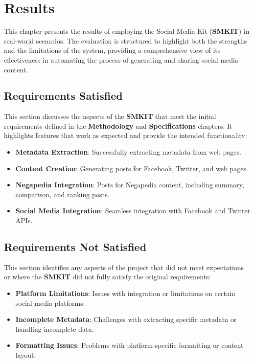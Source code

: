 
\chapter{Results}
\label{chp:results}
This chapter presents the results of employing the Social Media Kit (\textbf{SMKIT}) in real-world scenarios. The evaluation is structured to highlight both the strengths and the limitations of the system, providing a comprehensive view of its effectiveness in automating the process of generating and sharing social media content.


\section{Requirements Satisfied}
\label{sec:requirements_satisfied}
This section discusses the aspects of the \textbf{SMKIT} that meet the initial requirements defined in the \textbf{Methodology} and \textbf{Specifications} chapters. It highlights features that work as expected and provide the intended functionality:
\begin{itemize}
    \item \textbf{Metadata Extraction}: Successfully extracting metadata from web pages.
    \item \textbf{Content Creation}: Generating posts for Facebook, Twitter, and web pages.
    \item \textbf{Negapedia Integration}: Posts for Negapedia content, including summary, comparison, and ranking posts.
    \item \textbf{Social Media Integration}: Seamless integration with Facebook and Twitter APIs.
\end{itemize}


\section{Requirements Not Satisfied}
\label{sec:requirements_not_satisfied}
This section identifies any aspects of the project that did not meet expectations or where the \textbf{SMKIT} did not fully satisfy the original requirements:
\begin{itemize}
    \item \textbf{Platform Limitations}: Issues with integration or limitations on certain social media platforms.
    \item \textbf{Incomplete Metadata}: Challenges with extracting specific metadata or handling incomplete data.
    \item \textbf{Formatting Issues}: Problems with platform-specific formatting or content layout.
\end{itemize}


